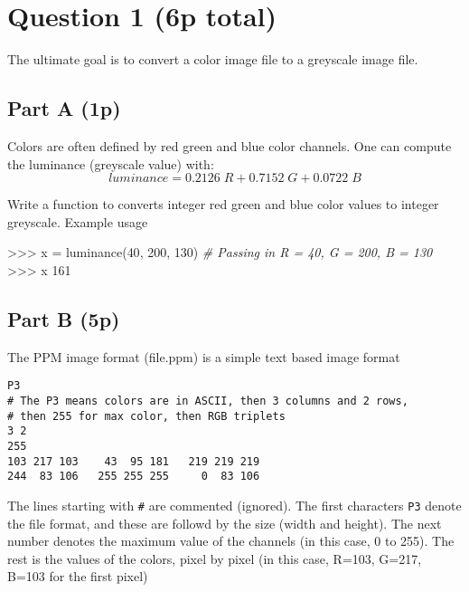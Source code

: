 \documentclass[]{article}
\newenvironment{Shaded}{}{}
\newcommand{\DecValTok}[1]{\textcolor[rgb]{0.25,0.63,0.44}{{#1}}}
\newcommand{\CommentTok}[1]{\textcolor[rgb]{0.38,0.63,0.69}{\textit{{#1}}}}
\newcommand{\NormalTok}[1]{{#1}}
\begin{document}
\newpage

\section{Question 1 (6p total)}\label{question-1-6p-total}

The ultimate goal is to convert a color image file to a greyscale image
file.

\subsection{Part A (1p)}\label{part-a-1p}

Colors are often defined by red green and blue color channels. One can
compute the luminance (greyscale value) with: \[
luminance = 0.2126\; R + 0.7152\; G + 0.0722\; B
\]

Write a function to converts integer red green and blue color values to
integer greyscale. Example usage

\begin{Shaded}
\begin{Highlighting}[]
\NormalTok{>>> x = luminance(}\DecValTok{40}\NormalTok{, }\DecValTok{200}\NormalTok{, }\DecValTok{130}\NormalTok{) }\CommentTok{# Passing in R = 40, G = 200, B = 130}
\NormalTok{>>> x}
\DecValTok{161}
\end{Highlighting}
\end{Shaded}

\subsection{Part B (5p)}\label{part-b-5p}

The PPM image format (file.ppm) is a simple text based image format

\begin{verbatim}
P3
# The P3 means colors are in ASCII, then 3 columns and 2 rows,
# then 255 for max color, then RGB triplets
3 2
255
103 217 103    43  95 181   219 219 219
244  83 106   255 255 255     0  83 106
\end{verbatim}

The lines starting with \texttt{\#} are commented (ignored). The first
characters \texttt{P3} denote the file format, and these are followd by
the size (width and height). The next number denotes the maximum value
of the channels (in this case, 0 to 255). The rest is the values of the
colors, pixel by pixel (in this case, R=103, G=217, B=103 for the first
pixel)
\end{document}
